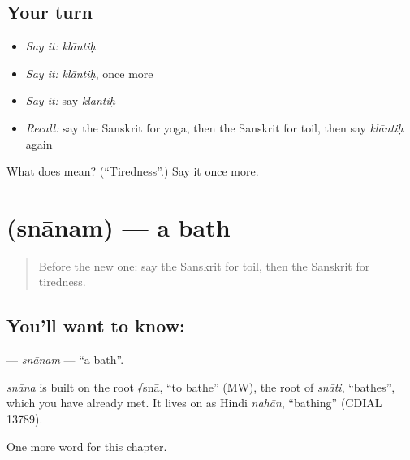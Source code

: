 \subsection*{Your turn}
\begin{itemize}
\raggedright
  \item \emph{Say it:} \emph{klāntiḥ}
  \item \emph{Say it:} \emph{klāntiḥ}, once more
  \item \emph{Say it:} say \emph{klāntiḥ}
  \item \emph{Recall:} say the Sanskrit for yoga, then the Sanskrit for toil, then say \emph{klāntiḥ} again
\end{itemize}

\begin{tcolorbox}[breakable,colback=teal!4,colframe=teal!35!black,title={Before you move on}]
What does  mean? (\textquotedblleft{}Tiredness\textquotedblright{}.) Say it once more.
\end{tcolorbox}
\section[\texorpdfstring{\sk{स्नानम्} (snānam)}{स्नानम् (snānam)}]{ (snānam) — a bath}

\label{lesson:SA-C211-snanam}



\begin{quote}
Before the new one: say the Sanskrit for toil, then the Sanskrit for tiredness.
\end{quote}

\subsection*{You'll want to know: }
\textbf{} — \emph{snānam} — \textquotedblleft{}a bath\textquotedblright{}.

\begin{cousinweb}
\emph{snāna} is built on the root √snā, \textquotedblleft{}to bathe\textquotedblright{} (MW), the root of \emph{snāti}, \textquotedblleft{}bathes\textquotedblright{}, which you have already met. It lives on as Hindi \emph{nahān}, \textquotedblleft{}bathing\textquotedblright{} (CDIAL 13789).
\end{cousinweb}

\begin{grammarlens}[title={What you've built}]
One more word for this chapter.
\end{grammarlens}

